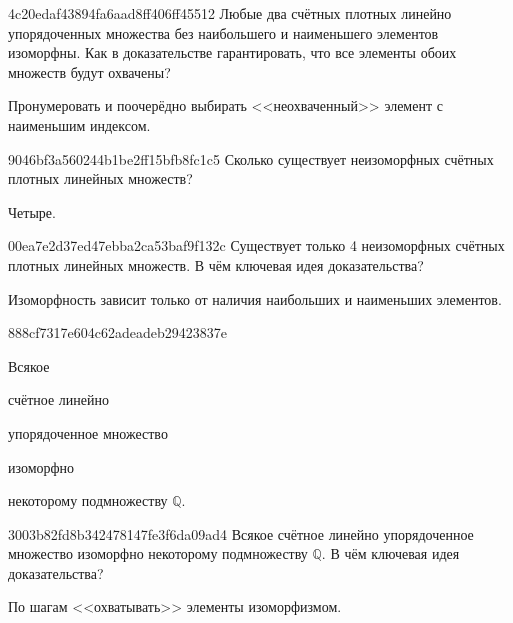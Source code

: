 \begin{note}{4c20edaf43894fa6aad8ff406ff45512}
    Любые два счётных плотных линейно упорядоченных множества без наибольшего и наименьшего элементов изоморфны.
    Как в доказательстве гарантировать, что все элементы обоих множеств будут охвачены?

    \begin{cloze}{1}
        Пронумеровать и поочерёдно выбирать <<неохваченный>> элемент с наименьшим индексом.
    \end{cloze}
\end{note}

\begin{note}{9046bf3a560244b1be2ff15bfb8fc1c5}
    Сколько существует неизоморфных счётных плотных линейных множеств?

    \begin{cloze}{1}
        Четыре.
    \end{cloze}
\end{note}

\begin{note}{00ea7e2d37ed47ebba2ca53baf9f132c}
    Существует только 4 неизоморфных счётных плотных линейных множеств.
    В чём ключевая идея доказательства?

    \begin{cloze}{1}
        Изоморфность зависит только от наличия наибольших и наименьших элементов.
    \end{cloze}
\end{note}

\begin{note}{888cf7317e604c62adeadeb29423837e}
    \begin{icloze}{4}Всякое\end{icloze} \begin{icloze}{3}счётное линейно\end{icloze} упорядоченное множество \begin{icloze}{2}изоморфно\end{icloze} \begin{icloze}{1}некоторому подмножеству \({ \mathbb Q }\).\end{icloze}
\end{note}

\begin{note}{3003b82fd8b342478147fe3f6da09ad4}
    Всякое счётное линейно упорядоченное множество изоморфно некоторому подмножеству \({ \mathbb Q }\).
    В чём ключевая идея доказательства?

    \begin{cloze}{1}
        По шагам <<охватывать>> элементы изоморфизмом.
    \end{cloze}
\end{note}

